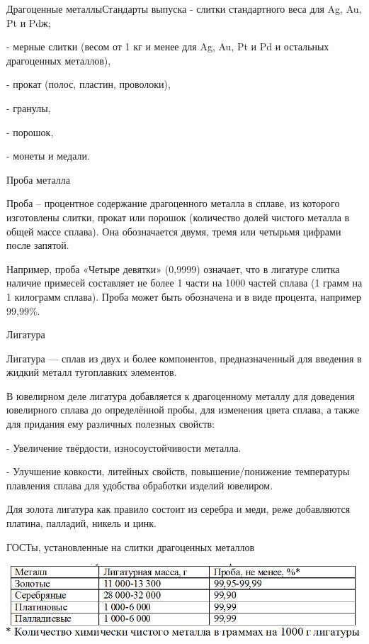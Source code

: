 \documentclass[_Banking_p3.tex]{subfiles}
\begin{document}
\begin{frame}{Драгоценные металлы}{Стандарты выпуска }
- слитки стандартного веса для Ag, Au, Pt и Pdж; 

- мерные слитки (весом от 1 кг и менее для Ag, Au, Pt и Pd и остальных драгоценных металлов), 

- прокат (полос, пластин, проволоки), 

- гранулы, 

- порошок, 

- монеты и медали.
\end{frame}
\begin{frame}[allowframebreaks]{Проба металла}
\begin{block}{Проба }
\quad
– процентное содержание драгоценного металла в сплаве, из которого изготовлены слитки, прокат или порошок (количество долей чистого металла в общей массе сплава). Она обозначается двумя, тремя или четырьмя цифрами после запятой. 
\end{block}

\pagebreak
Например, проба «Четыре девятки» (0,9999) означает, что в лигатуре слитка наличие примесей составляет не более 1 части на 1000 частей сплава (1 грамм на 1 килограмм сплава). Проба может быть обозначена и в виде процента, например 99,99\%.
\end{frame}

\begin{frame}[ allowframebreaks]{Лигатура}
\begin{block}{Лигатура}
\quad
— сплав из двух и более компонентов, предназначенный для введения в жидкий металл тугоплавких элементов.
\end{block}

\pagebreak
В ювелирном деле лигатура добавляется к драгоценному металлу для доведения ювелирного сплава до определённой пробы, для изменения цвета сплава, а также для придания ему различных полезных свойств:

    - Увеличение твёрдости, износоустойчивости металла. 
    
    - Улучшение ковкости, литейных свойств, повышение/понижение температуры плавления сплава для удобства обработки изделий ювелиром.

\pagebreak
Для золота лигатура как правило состоит из серебра и меди, реже добавляются платина, палладий, никель и цинк.
\end{frame}

\begin{frame}
\begin{table}
	\center
	\caption{ГОСТы, установленные на слитки драгоценных металлов}
	\includegraphics[scale=0.5]{img/gost.png}
\end{table}
\end{frame}
\end{document}
